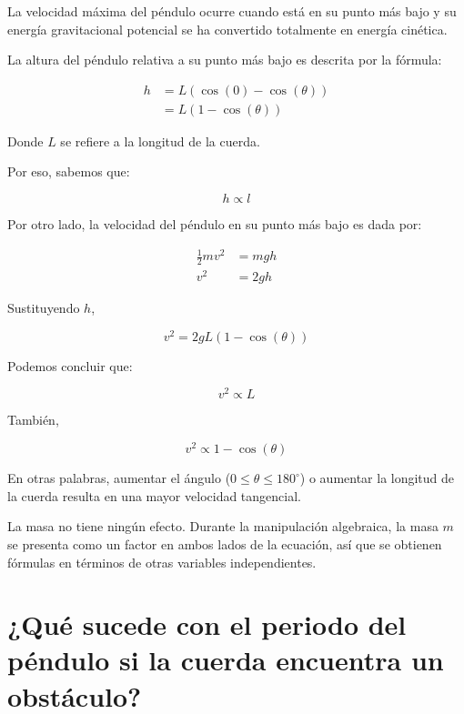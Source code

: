 \documentclass[letterpaper]{report}
\numberwithin{table}{section}
\begin{document}
La velocidad máxima del péndulo ocurre cuando está en su punto más
bajo y su energía gravitacional potencial se ha convertido totalmente
en energía cinética.

La altura del péndulo relativa a su punto más bajo es descrita por la fórmula:

\begin{align}
  h &= L(\cos(0) - \cos(\theta)) \nonumber \\
  &= L(1 - \cos(\theta))
\end{align}

Donde $L$ se refiere a la longitud de la cuerda.

Por eso, sabemos que:

\begin{equation}
  h \propto l
\end{equation}

Por otro lado, la velocidad del péndulo en su punto más bajo es dada por:

\begin{align}
  \frac{1}{2}m v^{2} &= mgh \\
  v^{2} &= 2gh
\end{align}

Sustituyendo $h$,

\begin{equation}
  v^{2} = 2gL(1 - \cos(\theta))
\end{equation}

Podemos concluir que:

\begin{equation}
  v^{2} \propto L
\end{equation}

También,

\begin{equation}
  v^{2} \propto 1 - \cos(\theta)
\end{equation}

En otras palabras, aumentar el ángulo ($0 \leq \theta \leq
180^{\circ}$) o aumentar la longitud de la cuerda resulta en una
mayor velocidad tangencial.

La masa no tiene ningún efecto. Durante la manipulación algebraica,
la masa $m$ se presenta como un factor en ambos lados de la ecuación,
así que se obtienen fórmulas en términos de otras variables independientes.

\section*{¿Qué sucede con el periodo del péndulo si la cuerda
encuentra un obstáculo?}
\end{document}
